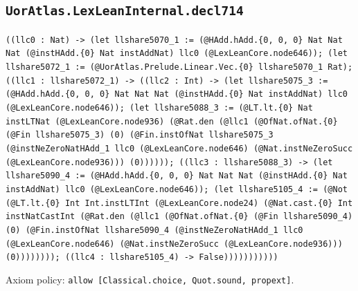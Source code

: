 \documentclass[11pt]{article}
\begin{document}
\subsection*{\texttt{UorAtlas.LexLeanInternal.decl714}}
\noindent\texttt{((llc0 : Nat) -> (let llshare5070\_1 := (@HAdd.hAdd.\{0, 0, 0\} Nat Nat Nat (@instHAdd.\{0\} Nat instAddNat) llc0 (@LexLeanCore.node646)); (let llshare5072\_1 := (@UorAtlas.Prelude.Linear.Vec.\{0\} llshare5070\_1 Rat); ((llc1 : llshare5072\_1) -> ((llc2 : Int) -> (let llshare5075\_3 := (@HAdd.hAdd.\{0, 0, 0\} Nat Nat Nat (@instHAdd.\{0\} Nat instAddNat) llc0 (@LexLeanCore.node646)); (let llshare5088\_3 := (@LT.lt.\{0\} Nat instLTNat (@LexLeanCore.node936) (@Rat.den (@llc1 (@OfNat.ofNat.\{0\} (@Fin llshare5075\_3) (0) (@Fin.instOfNat llshare5075\_3 (@instNeZeroNatHAdd\_1 llc0 (@LexLeanCore.node646) (@Nat.instNeZeroSucc (@LexLeanCore.node936))) (0)))))); ((llc3 : llshare5088\_3) -> (let llshare5090\_4 := (@HAdd.hAdd.\{0, 0, 0\} Nat Nat Nat (@instHAdd.\{0\} Nat instAddNat) llc0 (@LexLeanCore.node646)); (let llshare5105\_4 := (@Not (@LT.lt.\{0\} Int Int.instLTInt (@LexLeanCore.node24) (@Nat.cast.\{0\} Int instNatCastInt (@Rat.den (@llc1 (@OfNat.ofNat.\{0\} (@Fin llshare5090\_4) (0) (@Fin.instOfNat llshare5090\_4 (@instNeZeroNatHAdd\_1 llc0 (@LexLeanCore.node646) (@Nat.instNeZeroSucc (@LexLeanCore.node936))) (0)))))))); ((llc4 : llshare5105\_4) -> False)))))))))))}\par
\noindent Axiom policy: \texttt{allow [Classical.choice, Quot.sound, propext]}.\par
\end{document}
